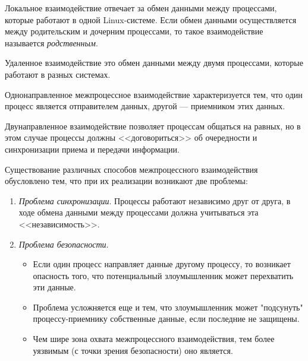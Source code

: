 \documentclass[xcolor=table]{beamer}
\begin{document}
\begin{frame}
	\begin{block}{Локальное взаимодействие}
		отвечает за обмен данными между процессами, которые работают в одной Linux-системе. Если обмен данными осуществляется между родительским и дочерним процессами, то такое взаимодействие называется 	\textit{родственным}.
	\end{block}
	\begin{block}{Удаленное взаимодействие}
		это обмен данными между двумя процессами, которые работают в разных системах. 
	\end{block}
	\begin{block}{Однонаправленное межпроцессное взаимодействие}
		характеризуется тем, что один процесс является отправителем данных, другой --- приемником этих данных.
	\end{block}
	\begin{block}{Двунаправленное взаимодействие}
	позволяет процессам общаться на равных, но в этом случае процессы должны <<договориться>> об очередности и синхронизации приема и передачи информации.
	\end{block}
\end{frame}

\begin{frame}
	Существование различных способов межпроцессного взаимодействия обусловлено тем, что при их реализации возникают две проблемы:
	\begin{enumerate}
		\item \textit{Проблема синхронизации}. Процессы работают независимо друг от друга, в ходе обмена данными между процессами должна учитываться эта <<независимость>>.
		\item \textit{Проблема безопасности}. 
		\begin{itemize}
			\item Если один процесс направляет данные другому процессу, то возникает опасность того, что потенциальный злоумышленник может перехватить эти данные. 
			\item Проблема усложняется еще и тем, что злоумышленник может "подсунуть" процессу-приемнику собственные данные, если последние не защищены. 
			\item Чем шире зона охвата межпроцессного взаимодействия, тем более уязвимым (с точки зрения безопасности) оно является.
		\end{itemize}
	\end{enumerate}
\end{frame}
\end{document}

